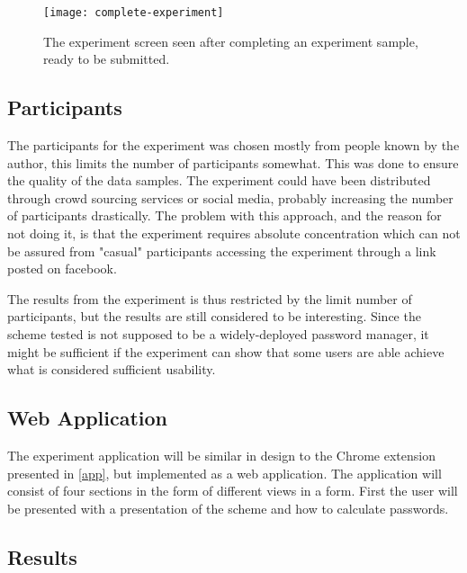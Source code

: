 \begin{figure}[h]
    \texttt{[image: complete-experiment]}
    \caption{The experiment screen seen after completing an experiment sample, ready to be submitted.}
    \label{complete-experiment}
\end{figure}

\subsection{Participants}
The participants for the experiment was chosen mostly from people known by the author, this limits the number of participants somewhat. This was done to ensure the quality of the data samples. The experiment could have been distributed through crowd sourcing services or social media, probably increasing the number of participants drastically. The problem with this approach, and the reason for not doing it, is that the experiment requires absolute concentration which can not be assured from "casual" participants accessing the experiment through a link posted on facebook. 
\par The results from the experiment is thus restricted  by the limit number of participants, but the results are still considered to be interesting. Since the scheme tested is not supposed to be a widely-deployed password manager, it might be sufficient if the experiment can show that some users are able achieve what is considered sufficient usability. 




\subsection{Web Application}
The experiment application will be similar in design to the Chrome extension presented in \autoref{app}, but implemented as a web application. The application will consist of four sections in the form of different views in a form. First the user will be presented with a presentation of the scheme and how to calculate passwords.


\subsection{Results}


